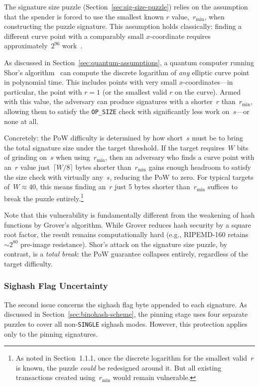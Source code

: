 \documentclass[11pt, a4paper]{article}
\begin{document}
The signature size puzzle (Section~\ref{sec:sig-size-puzzle}) relies on the assumption that the spender is forced to use the smallest known $r$ value,~$r_{\min}$, when constructing the puzzle signature. This assumption holds classically: finding a different curve point with a comparably small $x$-coordinate requires approximately~$2^{96}$ work~\cite[Section~4]{linus2024binohash}.

As discussed in Section~\ref{sec:quantum-assumptions}, a quantum computer running Shor's algorithm~\cite{shor1994} can compute the discrete logarithm of \emph{any} elliptic curve point in polynomial time. This includes points with very small $x$-coordinates---in particular, the point with $r = 1$ (or the smallest valid $r$ on the curve). Armed with this value, the adversary can produce signatures with a shorter~$r$ than~$r_{\min}$, allowing them to satisfy the \texttt{OP\_SIZE} check with significantly less work on~$s$---or none at all.

Concretely: the PoW difficulty is determined by how short~$s$ must be to bring the total signature size under the target threshold. If the target requires~$W$ bits of grinding on~$s$ when using~$r_{\min}$, then an adversary who finds a curve point with an~$r$ value just~$\lceil W/8 \rceil$ bytes shorter than~$r_{\min}$ gains enough headroom to satisfy the size check with virtually any~$s$, reducing the PoW to zero. For typical targets of~$W \approx 40$, this means finding an~$r$ just 5 bytes shorter than~$r_{\min}$ suffices to break the puzzle entirely.\footnote{As noted in Section~1.1.1, once the discrete logarithm for the smallest valid~$r$ is known, the puzzle \emph{could} be redesigned around it. But all existing transactions created using~$r_{\min}$ would remain vulnerable.}

Note that this vulnerability is fundamentally different from the weakening of hash functions by Grover's algorithm. While Grover reduces hash security by a square root factor, the result remains computationally hard (e.g., RIPEMD-160 retains~${\sim}2^{80}$ pre-image resistance). Shor's attack on the signature size puzzle, by contrast, is a \emph{total break}: the PoW guarantee collapses entirely, regardless of the target difficulty.

\subsubsection{Sighash Flag Uncertainty}
\label{sec:sighash-vulnerability}

The second issue concerns the sighash flag byte appended to each signature. As discussed in Section~\ref{sec:binohash-scheme}, the pinning stage uses four separate puzzles to cover all non-\texttt{SINGLE} sighash modes. However, this protection applies only to the pinning signatures.
\end{document}

